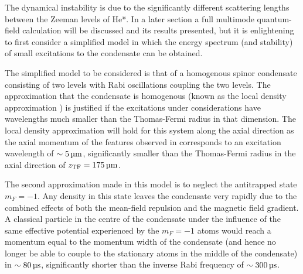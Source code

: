 The dynamical instability is due to the significantly different scattering lengths between the Zeeman levels of He*. In a later section a full multimode quantum-field calculation will be discussed and its results presented, but it is enlightening to first consider a simplified model in which the energy spectrum (and stability) of small excitations to the condensate can be obtained.

The simplified model to be considered is that of a homogenous spinor condensate consisting of two levels with Rabi oscillations coupling the two levels. The approximation that the condensate is homogenous (known as the local density approximation \cite{Stamper-Kurn:1999,Zambelli:2000}) is justified if the excitations under considerations have wavelengths much smaller than the Thomas-Fermi radius in that dimension. The local density approximation will hold for this system along the axial direction as the axial momentum of the features observed in  corresponds to an excitation wavelength of $\sim \unit[5]{\micro m}$, significantly smaller than the Thomas-Fermi radius in the axial direction of $z_\text{TF} = \unit[175]{\micro m}$. 

The second approximation made in this model is to neglect the antitrapped state $m_F=-1$. Any density in this state leaves the condensate very rapidly due to the combined effects of both the mean-field repulsion and the magnetic field gradient. A classical particle in the centre of the condensate under the influence of the same effective potential experienced by the $m_F=-1$ atoms would reach a momentum equal to the momentum width of the condensate (and hence no longer be able to couple to the stationary atoms in the middle of the condensate) in $\sim\unit[80]{\micro s}$, significantly shorter than the inverse Rabi frequency of $\sim \unit[300]{\micro s}$.

